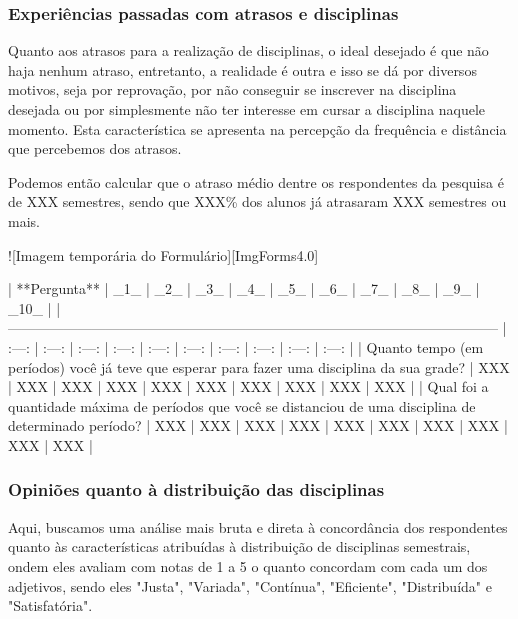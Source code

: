     \subsubsection{Experiências passadas com atrasos e disciplinas} %

        Quanto aos atrasos para a realização de disciplinas, o ideal desejado é que não haja nenhum atraso, entretanto, a realidade é outra e isso se dá por diversos motivos, seja por reprovação, por não conseguir se inscrever na disciplina desejada ou por simplesmente não ter interesse em cursar a disciplina naquele momento. Esta característica se apresenta na percepção da frequência e distância que percebemos dos atrasos.

        Podemos então calcular que o atraso médio dentre os respondentes da pesquisa é de XXX semestres, sendo que XXX\% dos alunos já atrasaram XXX semestres ou mais.

        ![Imagem temporária do Formulário][ImgForms4.0]

        | **Pergunta**                                                                                              |  _1_  |  _2_  |  _3_  |  _4_  |  _5_  |  _6_  |  _7_  |  _8_  |  _9_  | _10_  |
        | --------------------------------------------------------------------------------------------------------- | :---: | :---: | :---: | :---: | :---: | :---: | :---: | :---: | :---: | :---: |
        | Quanto tempo (em períodos) você já teve que esperar para fazer uma disciplina da sua grade?               |  XXX  |  XXX  |  XXX  |  XXX  |  XXX  |  XXX  |  XXX  |  XXX  |  XXX  |  XXX  |
        | Qual foi a quantidade máxima de períodos que você se distanciou de uma disciplina de determinado período? |  XXX  |  XXX  |  XXX  |  XXX  |  XXX  |  XXX  |  XXX  |  XXX  |  XXX  |  XXX  |

    \subsubsection{Opiniões quanto à distribuição das disciplinas} %

        Aqui, buscamos uma análise mais bruta e direta à concordância dos respondentes quanto às características atribuídas à distribuição de disciplinas semestrais, ondem eles avaliam com notas de 1 a 5 o quanto concordam com cada um dos adjetivos, sendo eles "Justa", "Variada", "Contínua", "Eficiente", "Distribuída" e "Satisfatória".


